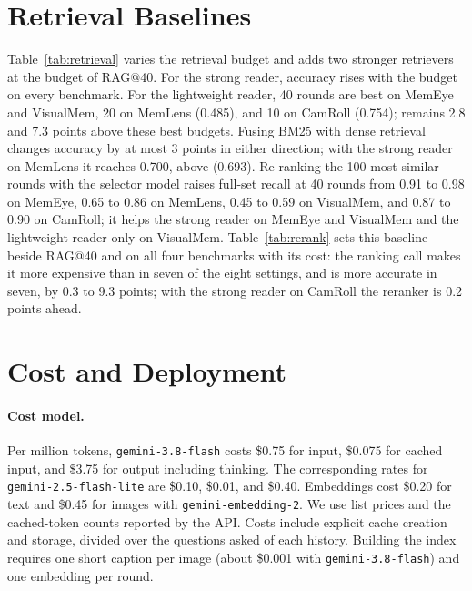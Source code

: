 \section{Retrieval Baselines}
\label{app:retrieval}

Table~\ref{tab:retrieval} varies the retrieval budget and adds two stronger retrievers at the budget of RAG@40. For the strong reader, accuracy rises with the budget on every benchmark. For the lightweight reader, 40 rounds are best on MemEye and VisualMem, 20 on MemLens (0.485), and 10 on CamRoll (0.754); \vgs{} remains 2.8 and 7.3 points above these best budgets. Fusing BM25 with dense retrieval changes accuracy by at most 3 points in either direction; with the strong reader on MemLens it reaches 0.700, above \vgs{} (0.693). Re-ranking the 100 most similar rounds with the selector model raises full-set recall at 40 rounds from 0.91 to 0.98 on MemEye, 0.65 to 0.86 on MemLens, 0.45 to 0.59 on VisualMem, and 0.87 to 0.90 on CamRoll; it helps the strong reader on MemEye and VisualMem and the lightweight reader only on VisualMem. Table~\ref{tab:rerank} sets this baseline beside RAG@40 and \vgs{} on all four benchmarks with its cost: the ranking call makes it more expensive than \vgs{} in seven of the eight settings, and \vgs{} is more accurate in seven, by 0.3 to 9.3 points; with the strong reader on CamRoll the reranker is 0.2 points ahead.





\section{Cost and Deployment}
\label{app:cost}

\paragraph{Cost model.} Per million tokens, \texttt{gemini-3.8-flash} costs \$0.75 for input, \$0.075 for cached input, and \$3.75 for output including thinking. The corresponding rates for \texttt{gemini-2.5-flash-lite} are \$0.10, \$0.01, and \$0.40. Embeddings cost \$0.20 for text and \$0.45 for images with \texttt{gemini-embedding-2}. We use list prices and the cached-token counts reported by the API. Costs include explicit cache creation and storage, divided over the questions asked of each history. Building the index requires one short caption per image (about \$0.001 with \texttt{gemini-3.8-flash}) and one embedding per round.

